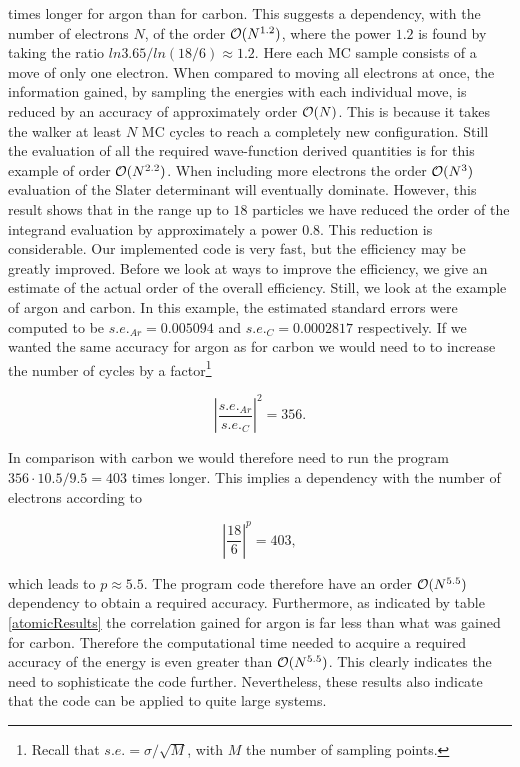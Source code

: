 times longer for argon than for carbon. This suggests a dependency,
with the number of electrons $N$, of the order ${\cal
  O}(N^{1.2})$, where the power  $1.2$ is found by taking the ratio $ln
3.65 / ln (18/6) \approx 1.2$. 
\newline
%
\newline
Here each MC sample consists of a move of only one electron. When
compared to moving all electrons at once, the information gained, by
sampling the energies with each individual move, is reduced by an
accuracy of approximately order ${\cal O}(N)$. This is because it
takes the walker at least $N$ 
MC cycles to reach a completely new configuration. Still the
evaluation of all the required wave-function derived quantities is for
this example of order ${\cal O}(N^{2.2})$. When including more
electrons the order ${\cal O}(N^3)$ evaluation of the Slater
determinant will eventually dominate. However, this result shows that
in the range up to $18$ particles we have reduced the order of the
integrand evaluation by approximately a power $0.8$. This reduction is
considerable.
\newline
%
\newline
Our implemented code is very fast, but the efficiency may be greatly
improved. Before we look at ways to improve the efficiency, we give an
estimate of the actual order of the overall efficiency. Still, we look
at the example of argon and carbon. In this 
example, the estimated standard errors were computed to be $s.e._{Ar} =
0.005094$ and $s.e._{C} = 0.0002817$ respectively. If we wanted the
same accuracy for argon as for carbon we would need to to increase the
number of cycles by a factor\footnote{Recall that $s.e. =
  \sigma/\sqrt{M}$, with $M$ the number of sampling points.}

\begin{equation*} 
  \left|\frac{s.e._{Ar}}{s.e._{C}}\right|^2 = 356.
\end{equation*}

In comparison with carbon we would therefore need to run the program
$356\cdot 10.5/9.5 = 403$ times longer. This implies a dependency with
the number of electrons according to

\begin{equation*}
  \left|\frac{18}{6}\right|^p = 403,
\end{equation*}

which leads to $p \approx 5.5$. The program code therefore have an
order ${\cal O}(N^{5.5})$ dependency to obtain a required
accuracy. Furthermore, as indicated by table \ref{atomicResults} the
correlation gained for argon is far less than what was gained for
carbon. Therefore the computational time needed to acquire a required
accuracy of the energy is even greater than ${\cal O}(N^{5.5})$. This
clearly indicates the need to sophisticate the code
further. Nevertheless, these results also indicate that the code can
be applied to quite large systems. 
\newline


